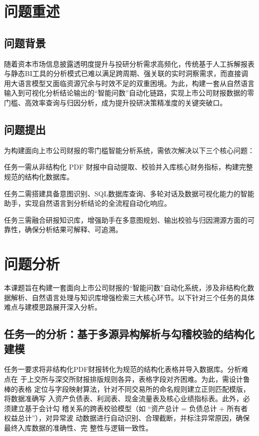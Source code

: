 \documentclass[withoutpreface,bwprint]{cumcmthesis} %
\begin{document}
\section{问题重述}

\subsection{问题背景}
随着资本市场信息披露透明度提升与投研分析需求高频化，传统基于人工拆解报表与静态BI工具的分析模式已难以满足跨周期、强关联的实时洞察需求，而直接调用大语言模型又面临资源冗余与时效不足的双重困境。为此，构建一套从自然语言输入到可视化分析结论输出的“智能问数”自动化链路，实现上市公司财报数据的零门槛、高效率查询与归因分析，成为提升投研决策精准度的关键突破口。

\subsection{问题提出}

为构建面向上市公司财报的零门槛智能分析系统，需依次解决以下三个核心问题：

任务一需从非结构化 PDF 财报中自动提取、校验并入库核心财务指标，构建完整规范的结构化数据库。

任务二需搭建具备意图识别、SQL数据库查询、多轮对话及数据可视化能力的智能助手，实现自然语言到分析结论的全流程自动化响应。

任务三需融合研报知识库，增强助手在多意图规划、输出校验与归因溯源方面的可靠性，确保分析结果可解释、可追溯。
\section{问题分析}

本课题旨在构建一套面向上市公司财报的“智能问数”自动化系统，涉及非结构化数据解析、自然语言处理与知识库增强检索三大核心环节。以下针对三个任务的具体难点与建模思路展开深入分析。

\subsection{任务一的分析：基于多源异构解析与勾稽校验的结构化建模}

任务一要求将非结构化PDF财报转化为规范的结构化表格并导入数据库。分析难点在
于上交所与深交所财报排版规则各异，表格字段对齐困难。为此，需设计鲁棒的表格
定位与字段映射算法，针对不同交易所的命名规则建立正则匹配模版，将数据准确写
入资产负债表、利润表、现金流量表及核心业绩指标表。此外，必须建立基于会计勾
稽关系的跨表校验模型（如 “资产总计 = 负债总计 + 所有者权益总计”），对异常波
动数据进行自动识别、合理截断，并标注异常原因，确保最终入库数据的准确性、完
整性与逻辑一致性。
\end{document}
